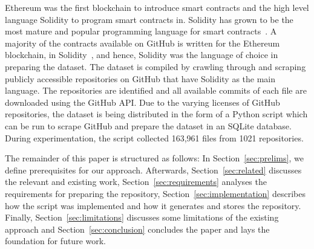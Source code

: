 \documentclass[10pt,conference]{IEEEtran}
\begin{document}
	Ethereum was the first blockchain to introduce smart contracts and the high level language Solidity to program smart contracts in. Solidity has grown to be the most mature and popular programming language for smart contracts~\cite{soliditycheck}. A majority of the contracts available on GitHub is written for the Ethereum blockchain, in Solidity~\cite{empiricalgithubcontracts}, and hence, Solidity was the language of choice in preparing the dataset.  The dataset is compiled by crawling through and scraping publicly accessible repositories on GitHub that have Solidity as the main language. The repositories are identified and all available commits of each file are downloaded using the GitHub API. Due to the varying licenses of GitHub repositories, the dataset is being distributed in the form of a Python script which can be run to scrape GitHub and prepare the dataset in an SQLite database. During experimentation, the script collected 163,961 files from 1021 repositories.
	
	The remainder of this paper is structured as follows: In Section~\ref{sec:prelims}, we define  prerequisites for our approach. 	Afterwards, Section~\ref{sec:related} discusses the relevant and existing work, Section~\ref{sec:requirements} analyses the requirements for preparing the repository, Section~\ref{sec:implementation} describes how the script was implemented and how it generates and stores the repository. Finally, Section~\ref{sec:limitations} discusses some limitations of the existing approach and Section~\ref{sec:conclusion} concludes the paper and lays the foundation for future work.
	
\end{document}
